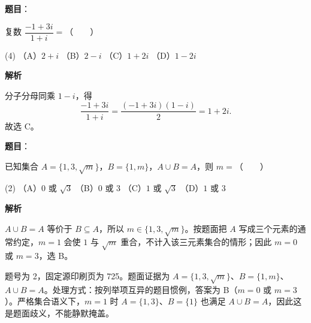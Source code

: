 

\begin{answer}

\textbf{题目}：

复数 $\dfrac{-1+3i}{1+i}=$\mbox{（　　）}

\begin{gkopts}(4)
\task （A）$2+i$
\task （B）$2-i$
\task （C）$1+2i$
\task （D）$1-2i$
\end{gkopts}

\textbf{解析}

分子分母同乘 $1-i$，得
\nopagebreak[4]
\[
\frac{-1+3i}{1+i}=\frac{(-1+3i)(1-i)}2=1+2i.
\]
故选 C。


\end{answer}
\begin{answer}

\textbf{题目}：

已知集合 $A=\{1,3,\sqrt m\}$，$B=\{1,m\}$，$A\cup B=A$，则 $m=$\mbox{（　　）}

\begin{gkopts}(2)
\task （A）$0$ 或 $\sqrt3$
\task （B）$0$ 或 $3$
\task （C）$1$ 或 $\sqrt3$
\task （D）$1$ 或 $3$
\end{gkopts}

\textbf{解析}

$A\cup B=A$ 等价于 $B\subseteq A$，所以 $m\in\{1,3,\sqrt m\}$。按题面把 $A$ 写成三个元素的通常约定，$m=1$ 会使 $1$ 与 $\sqrt m$ 重合，不计入该三元素集合的情形；因此 $m=0$ 或 $m=3$，选 B。


题号为 2，固定源印刷页为 725。题面证据为 $A=\{1,3,\sqrt m\}$、$B=\{1,m\}$、$A\cup B=A$。处理方式：按列举项互异的题目惯例，答案为 B（$m=0$ 或 $m=3$）。严格集合语义下，$m=1$ 时 $A=\{1,3\}$、$B=\{1\}$ 也满足 $A\cup B=A$，因此这是题面歧义，不能静默掩盖。


\end{answer}
